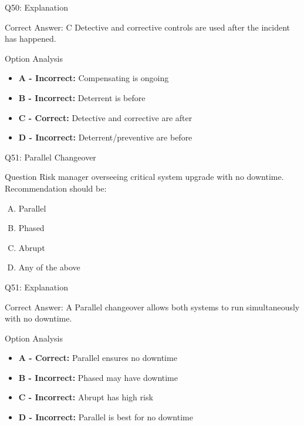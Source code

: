 \documentclass{beamer}
\begin{document}
	\begin{frame}{Q50: Explanation}
		\begin{block}{Correct Answer: C}
			Detective and corrective controls are used after the incident has happened.
		\end{block}
		\begin{block}{Option Analysis}
			\begin{itemize}
				\item \textbf{A - Incorrect:} Compensating is ongoing
				\item \textbf{B - Incorrect:} Deterrent is before
				\item \textbf{C - Correct:} Detective and corrective are after
				\item \textbf{D - Incorrect:} Deterrent/preventive are before
			\end{itemize}
		\end{block}
	\end{frame}
	
	\begin{frame}{Q51: Parallel Changeover}
		\begin{block}{Question}
			Risk manager overseeing critical system upgrade with no downtime. Recommendation should be:
		\end{block}
		\begin{enumerate}[(A)]
			\item Parallel
			\item Phased
			\item Abrupt
			\item Any of the above
		\end{enumerate}
	\end{frame}
	
	\begin{frame}{Q51: Explanation}
		\begin{block}{Correct Answer: A}
			Parallel changeover allows both systems to run simultaneously with no downtime.
		\end{block}
		\begin{block}{Option Analysis}
			\begin{itemize}
				\item \textbf{A - Correct:} Parallel ensures no downtime
				\item \textbf{B - Incorrect:} Phased may have downtime
				\item \textbf{C - Incorrect:} Abrupt has high risk
				\item \textbf{D - Incorrect:} Parallel is best for no downtime
			\end{itemize}
		\end{block}
	\end{frame}
	
\end{document}
